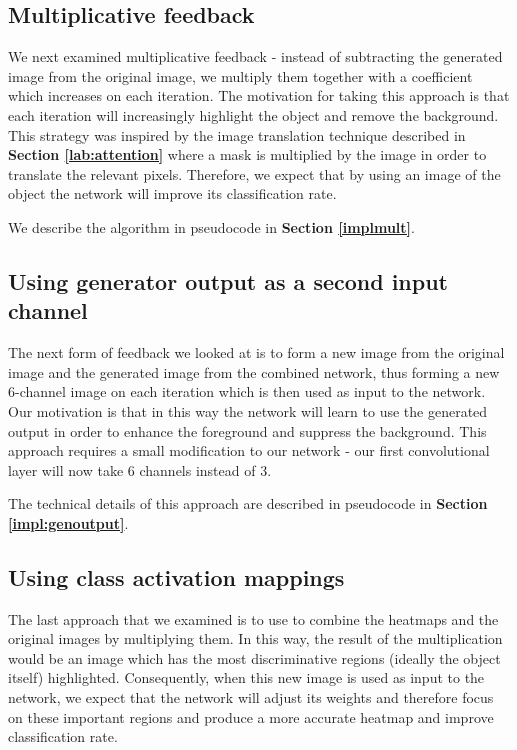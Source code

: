 \documentclass{l4proj}
\begin{document}
\subsection{Multiplicative feedback}
\label{app:multiplicative}
We next examined multiplicative feedback - instead of subtracting the generated image from the original image, we multiply them together with a coefficient which increases on each iteration.
The motivation for taking this approach is that each iteration will increasingly highlight the object and remove the background. This strategy was inspired by the image translation technique described in \textbf{Section \ref{lab:attention}} where a mask is multiplied by the image in order to translate the relevant pixels.
Therefore, we expect that by using an image of the object the network will improve its classification rate.

We describe the algorithm in pseudocode in \textbf{Section \ref{implmult}}.

\subsection{Using generator output as a second input channel}
\label{app:genout}
The next form of feedback we looked at is to form a new image from the original image and the generated image from the combined network, thus forming a new 6-channel image on each iteration which is then used as input to the network. Our motivation is that in this way the network will learn to use the generated output in order to enhance the foreground and suppress the background.
This approach requires a small modification to our network - our first convolutional layer will now take 6 channels instead of 3. 

The technical details of this approach are described in pseudocode in \textbf{Section \ref{impl:genoutput}}.

\subsection{Using class activation mappings}
The last approach that we examined is to use to combine the heatmaps and the original images by multiplying them. In this way, the result of the multiplication would be an image which has the most discriminative regions (ideally the object itself) highlighted. Consequently, when this new image is used as input to the network, we expect that the network will adjust its weights and therefore focus on these important regions and produce a more accurate heatmap and improve classification rate.
\end{document}
